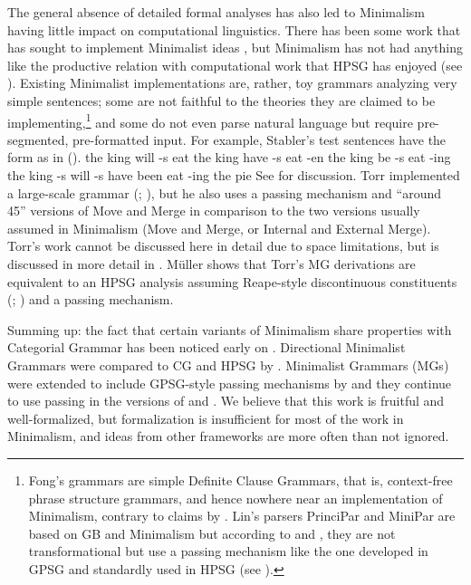 \documentclass[output=paper,biblatex,babelshorthands,newtxmath,draftmode,colorlinks,citecolor=brown]{langscibook}
\begin{document}
The general absence of detailed formal analyses has also led to Minimalism having little impact on
computational linguistics. There has been some work that has sought to implement Minimalist ideas
\citep{Stabler2001a,FG2012a,Fong2014a,Torr2019a-u}, but Minimalism has not had anything like the productive
relation with computational work that HPSG has enjoyed (see ). Existing Minimalist implementations are, rather, toy
grammars analyzing very simple sentences; some are not faithful to the theories they are claimed to
be implementing,\footnote{%
  Fong's grammars are simple Definite Clause Grammars, that is, context-free phrase structure grammars, and hence nowhere near an implementation of
  Minimalism, contrary to claims by \citet*[]{BPYC2011a}.
  Lin's parsers PrinciPar and MiniPar \citeyearpar{Lin93a,Lin2003a-u} are based on GB and Minimalism
  but according to \citet[]{Lin93a} and \citet[]{TSSC2019a}, they
  are not transformational but use a \slasch passing mechanism like the one developed in GPSG
  \citep{Gazdar81a} and standardly used in HPSG (see ).
} and some do not even parse natural language but require pre-segmented, pre-formatted
input. For example, Stabler's test sentences have the form as in ().
\eal
\ex the king will -s eat
\ex the king have -s eat -en
\ex the king be -s eat -ing
\ex the king -s will -s have been eat -ing the pie
\zl
See \citet[Section~4.7.2]{MuellerGT-Eng4} for discussion. Torr implemented a large-scale grammar
(\citealt*[]{TSSC2019a}; \citealt{Torr2019a-u}), but he also uses a \slasch passing mechanism and ``around 45''
versions of Move and Merge \citep[]{TSSC2019a} in comparison to the two versions usually assumed in
Minimalism (Move and Merge, or Internal and External Merge). Torr's work cannot be discussed here in 
detail due to space limitations, but is discussed in more detail in \citet[--180]{MuellerGT-Eng4}. Müller shows that Torr's MG derivations are equivalent to an HPSG analysis
assuming Reape-style discontinuous constituents (\citealt{Reape94a};
) and a \slasch passing mechanism.


Summing up: the fact that certain variants of Minimalism share properties with Categorial Grammar
has been noticed early on \citep{BE95a}. Directional Minimalist Grammars were compared to CG and HPSG
by \citet[Section~2.3]{MuellerUnifying}. Minimalist Grammars (MGs) were extended to include GPSG-style \slasch passing mechanisms by
\citet{Kobele2008a} and they continue to use \slasch passing in the versions of \citet{TS2016a} and \citet{Torr2019a-u}. We believe that
this work is fruitful and well-formalized, but formalization is insufficient for most of the work in
Minimalism, and ideas from other frameworks are more often than not ignored.
\end{document}
